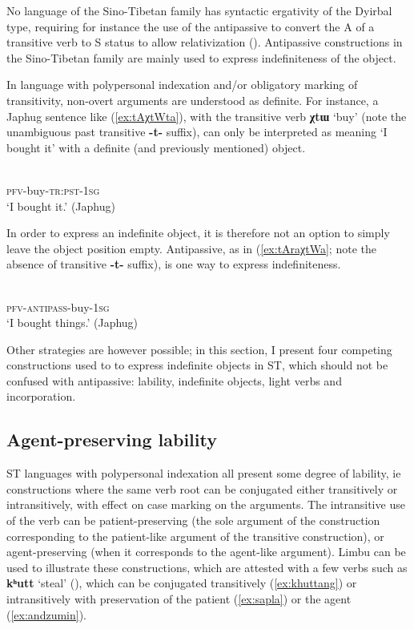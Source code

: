 \documentclass[oneside,a4paper,11pt]{article}
\newcommand{\ipa}[1]{{\phon\textbf{#1}}}
\begin{document}
No language of the Sino-Tibetan family has syntactic ergativity of the Dyirbal type, requiring for instance the use of the antipassive to convert the A  of a transitive verb to S status to allow relativization (\citealt[170]{dixon94erg}). Antipassive constructions in the Sino-Tibetan family are mainly used to express indefiniteness of the object.

In language with polypersonal indexation and/or obligatory marking of transitivity, non-overt arguments are understood as definite. For instance, a Japhug sentence like (\ref{ex:tAχtWta}), with the transitive verb \ipa{χtɯ} `buy' (note the unambiguous past transitive \ipa{-t-} suffix), can only be interpreted as meaning `I bought it' with a definite (and previously mentioned) object.

\begin{exe}
\ex \label{ex:tAχtWta}
\gll \ipa{tɤ-χtɯ-t-a} \\
\textsc{pfv}-buy-\textsc{tr:pst-1sg} \\
\glt `I bought it.' (Japhug)
\end{exe}

In order to express an indefinite object, it is therefore not an option to simply leave the object position empty. Antipassive, as in (\ref{ex:tAraχtWa}; note the absence of transitive \ipa{-t-} suffix), is one way to express indefiniteness. 

\begin{exe}
\ex \label{ex:tAraχtWa}
\gll \ipa{tɤ-ra-χtɯ-a} \\
\textsc{pfv}-\textsc{antipass}-buy-\textsc{1sg} \\
\glt `I bought things.' (Japhug)
\end{exe}

Other strategies are however possible; in this section, I present four competing constructions used to to express indefinite objects in ST, which should not be confused with antipassive: lability, indefinite objects, light verbs and incorporation.  

\subsection{Agent-preserving lability} \label{sec:labile}
ST languages with polypersonal indexation all present some degree of lability, ie constructions where the same verb root can be conjugated either transitively or intransitively, with effect on case marking on the arguments. The intransitive use of the verb can be patient-preserving (the sole argument of the construction corresponding to the patient-like argument of the transitive construction), or agent-preserving (when it corresponds to the agent-like argument).  Limbu can be used to illustrate these constructions, which are attested with a few verbs such as  \ipa{kʰutt} `steal' (\citealt[527]{driem91tangut}), which can be conjugated transitively (\ref{ex:khuttang}) or intransitively with preservation of the patient (\ref{ex:sapla}) or the agent (\ref{ex:andzumin}).
\end{document}
